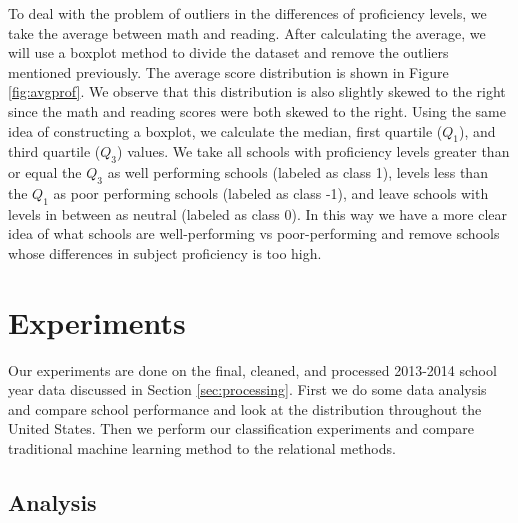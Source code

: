 To deal with the problem of outliers in the differences of proficiency levels, we take the average between math and reading. After calculating the average, we will use a boxplot method to divide the dataset and remove the outliers mentioned previously. The average score distribution is shown in Figure \ref{fig:avgprof}. We observe that this distribution is also slightly skewed to the right since the math and reading scores were both skewed to the right. Using the same idea of constructing a boxplot, we calculate the median, first quartile ($Q_1$), and third quartile ($Q_3$) values. We take all schools with proficiency levels greater than or equal the $Q_3$ as well performing schools (labeled as class 1), levels less than the $Q_1$ as poor performing schools (labeled as class -1), and leave schools with levels in between as neutral (labeled as class 0). In this way we have a more clear idea of what schools are well-performing vs poor-performing and remove schools whose differences in subject proficiency is too high.

\section{Experiments} \label{sec:experiment}

Our experiments are done on the final, cleaned, and processed 2013-2014 school year data discussed in Section \ref{sec:processing}. First we do some data analysis and compare school performance and look at the distribution throughout the United States. Then we perform our classification experiments and compare traditional machine learning method to the relational methods.

\begin{table}
	\caption{Statistics about the education dataset.}
	\label{tab:classes}
\end{table}

\subsection{Analysis} \label{sec:analysis}

